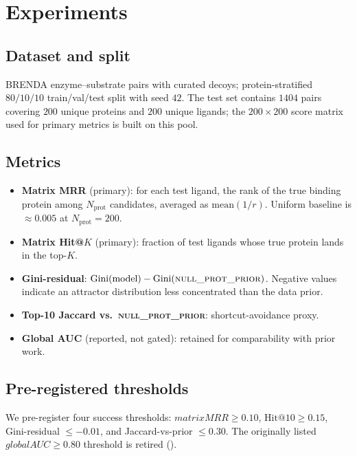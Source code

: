 \documentclass[11pt,a4paper]{article}
\newcommand{\nullprior}{\textsc{null\_prot\_prior}\xspace}
\newcommand{\gauc}{global AUC}
\newcommand{\matmrr}{matrix MRR}
\begin{document}
\section{Experiments}
\label{sec:experiments}

\subsection{Dataset and split}
BRENDA enzyme--substrate pairs with curated decoys; protein-stratified
$80/10/10$ train/val/test split with seed $42$. The test set contains
$1404$ pairs covering $200$ unique proteins and $200$ unique ligands;
the $200 \times 200$ score matrix used for primary metrics is built on
this pool.

\subsection{Metrics}
\begin{itemize}[leftmargin=*,itemsep=0pt,topsep=1pt]
  \item \textbf{Matrix MRR} (primary): for each test ligand, the rank of
        the true binding protein among $N_{\text{prot}}$ candidates,
        averaged as $\mathrm{mean}(1/r)$. Uniform baseline is
        $\approx 0.005$ at $N_{\text{prot}} = 200$.
  \item \textbf{Matrix Hit@$K$} (primary): fraction of test ligands
        whose true protein lands in the top-$K$.
  \item \textbf{Gini-residual}: $\mathrm{Gini}(\text{model}) -
        \mathrm{Gini}(\nullprior)$. Negative values indicate an
        attractor distribution less concentrated than the data prior.
  \item \textbf{Top-10 Jaccard vs.\ \nullprior}: shortcut-avoidance
        proxy.
  \item \textbf{Global AUC} (reported, not gated): retained for
        comparability with prior work.
\end{itemize}

\subsection{Pre-registered thresholds}
We pre-register four success thresholds:
$\matmrr \geq 0.10$, $\text{Hit@10} \geq 0.15$, Gini-residual
$\leq -0.01$, and Jaccard-vs-prior $\leq 0.30$. The originally listed
$\gauc \geq 0.80$ threshold is retired ().
\end{document}
